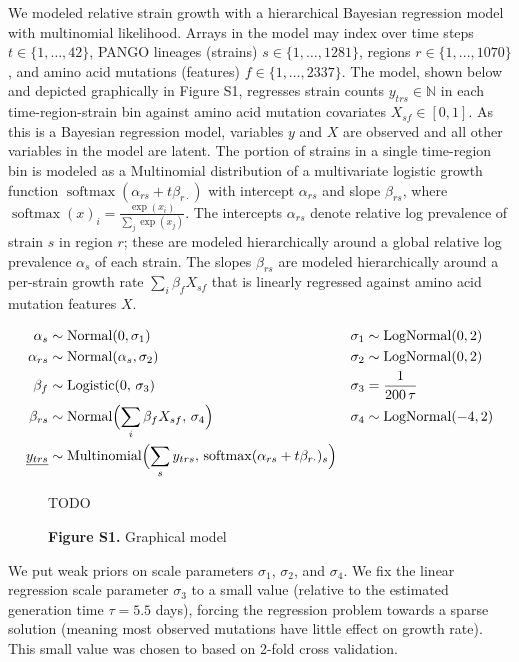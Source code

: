 \documentclass[12pt]{article}
\begin{document}
We modeled relative strain growth with a hierarchical Bayesian regression model with multinomial likelihood.
Arrays in the model may index over time steps $t\in \{1,\dots,42\}$, PANGO lineages (strains) $s\in\{1,\dots,1281\}$, regions $r\in\{1,...,1070\}$, and amino acid mutations (features) $f\in\{1,\dots,2337\}$.
The model, shown below and depicted graphically in Figure S1, regresses strain counts $y_{trs}\in\mathbb N$ in each time-region-strain bin against amino acid mutation covariates $X_{sf} \in [0,1]$.
As this is a Bayesian regression model, variables $y$ and $X$ are observed and all other variables in the model are latent.
The portion of strains in a single time-region bin is modeled as a Multinomial distribution of a multivariate logistic growth function $\operatorname{softmax}(\alpha_{rs} + t\beta_{r\cdot})$ with intercept $\alpha_{rs}$ and slope $\beta_{rs}$, where
$
  \operatorname{softmax}(x)_i = \frac {\exp(x_i)} {\sum_j \exp(x_j)}.
$
The intercepts $\alpha_{rs}$ denote relative log prevalence of strain $s$ in region $r$; these are modeled hierarchically around a global relative log prevalence $\alpha_s$ of each strain.
The slopes $\beta_{rs}$ are modeled hierarchically around a per-strain growth rate $\sum_i \beta_f X_{sf}$ that is linearly regressed against amino acid mutation features $X$.

\begin{align*}
  \textstyle
  \alpha_s &\sim \operatorname{Normal}(0, \sigma_1) &
  \sigma_1 &\sim \operatorname{LogNormal}(0, 2) \\
  \alpha_{rs} &\sim \operatorname{Normal}(\alpha_s, \sigma_2) &
  \sigma_2 &\sim \operatorname{LogNormal}(0, 2) \\
  \beta_f &\sim \operatorname{Logistic}(0,\, \sigma_3) &
  \sigma_3 &= \frac{1}{200\, \tau} \\
  \beta_{rs} &\sim \operatorname{Normal}\Bigl(
   \sum_i \beta_f X_{sf},\, \sigma_4
  \Bigr) &
  \sigma_4 &\sim \operatorname{LogNormal}(-4, 2) \\
  \underline{y_{trs}} &\sim \operatorname{Multinomial}\Bigl(
    \sum_s y_{trs},\, \operatorname{softmax}(\alpha_{rs} + t \beta_{r\cdot})_s
  \Bigr)
\end{align*}

\begin{figure*}
TODO
\caption{\textbf{Figure S1.} Graphical model}
\end{figure*}

We put weak priors on scale parameters $\sigma_1$, $\sigma_2$, and $\sigma_4$.
We fix the linear regression scale parameter $\sigma_3$ to a small value (relative to the estimated generation time $\tau=5.5$ days), forcing the regression problem towards a sparse solution (meaning most observed mutations have little effect on growth rate).
This small value was chosen to based on 2-fold cross validation.
\end{document}
